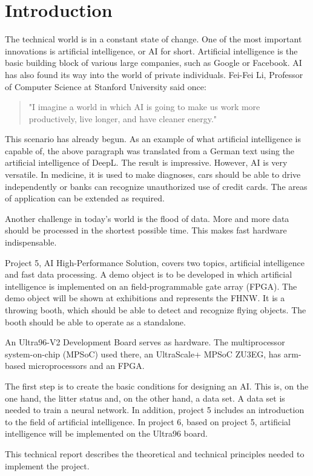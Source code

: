 \section{Introduction}
\label{sec:introduction}
The technical world is in a constant state of change. One of the most important innovations is artificial intelligence, or AI for short.
Artificial intelligence is the basic building block of various large companies, such as Google or Facebook.
AI has also found its way into the world of private individuals.
Fei-Fei Li, Professor of Computer Science at Stanford University said once:
\begin{quote}
	"I imagine a world in which AI is going to make us work more productively, live longer, and have cleaner energy."\cite{quotes_future}
\end{quote}
This scenario has already begun. As an example of what artificial intelligence is capable of, the above paragraph was translated from a German text using the artificial intelligence of DeepL. The result is impressive.
However, AI is very versatile. In medicine, it is used to make diagnoses, cars should be able to drive independently or banks can recognize unauthorized use of credit cards\cite{artificial_intelligence_a_modern_approach}. 
The areas of application can be extended as required.

Another challenge in today's world is the flood of data. More and more data should be processed in the shortest possible time. This makes fast hardware indispensable.

Project 5, AI High-Performance Solution, covers two topics, artificial intelligence and fast data processing.
A demo object is to be developed in which artificial intelligence is implemented on an field-programmable gate array (FPGA).
The demo object will be shown at exhibitions and represents the FHNW.
It is a throwing booth, which should be able to detect and recognize flying objects.
The booth should be able to operate as a standalone.

An Ultra96-V2 Development Board serves as hardware.
The multiprocessor system-on-chip (MPSoC) used there, an UltraScale+ MPSoC ZU3EG, has arm-based microprocessors and an FPGA.

The first step is to create the basic conditions for designing an AI.
This is, on the one hand, the litter status and, on the other hand, a data set. A data set is needed to train a neural network.
In addition, project 5 includes an introduction to the field of artificial intelligence.
In project 6, based on project 5, artificial intelligence will be implemented on the Ultra96 board.

This technical report describes the theoretical and technical principles needed to implement the project.